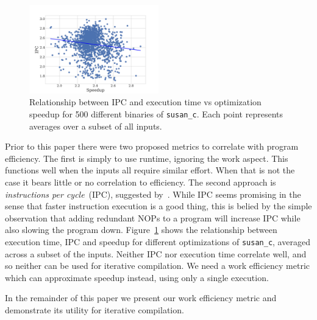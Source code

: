     \begin{figure}[t]
        \centering
        \includegraphics[width=0.5\textwidth]{figs/motivation-metric.pdf}
        \caption{
            Relationship between IPC and execution time vs optimization speedup for 500 different binaries of \texttt{susan\_c}.
            Each point represents averages over a subset of all inputs.
        }
        \label{fig:motivation-metric}
    \end{figure}
    
    Prior to this paper there were two proposed metrics to correlate with program efficiency. The first is simply to use runtime, ignoring
    the work aspect. This functions well when the inputs all require similar effort. When that is not the case it bears little or no
    correlation to efficiency. The second approach is \textit{instructions per cycle}~(IPC), suggested by~\citep{fursin07}. While IPC seems
    promising in the sense that faster instruction execution is a good thing, this is belied by the simple observation that adding
    redundant NOPs to a program will increase IPC while also slowing the program down. Figure~\ref{fig:motivation-metric} shows the
    relationship between execution time, IPC and speedup for different optimizations of \texttt{susan\_c}, averaged across a subset of the inputs.
    Neither IPC nor execution time correlate well, and so neither can be used for iterative compilation. We need a work efficiency metric
    which can approximate speedup instead, using only a single execution.

    In the remainder of this paper we present our work efficiency metric and demonstrate its utility for iterative compilation.
